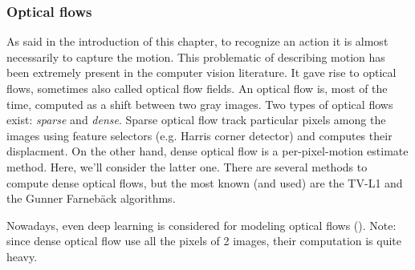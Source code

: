 \documentclass[12pt, a4paper]{report}
\begin{document}
				\subsubsection{Optical flows}
					As said in the introduction of this chapter, to recognize an action it is almost necessarily to capture the motion.
					This problematic of describing motion has been extremely present in the computer vision literature.
					It gave rise to optical flows, sometimes also called optical flow fields.
					An optical flow is, most of the time, computed as a shift between two gray images.
					Two types of optical flows exist: {\itshape sparse} and {\itshape dense}.
					Sparse optical flow track particular pixels among the images using feature selectors (e.g. Harris corner detector) and computes their displacment.
					On the other hand, dense optical flow is a per-pixel-motion estimate method.
					Here, we'll consider the latter one.
					There are several methods to compute dense optical flows, but the most known (and used) are the TV-L1 \cite{sanchez} and the Gunner Farnebäck \cite{farneback} algorithms.\par
					Nowadays, even deep learning is considered for modeling optical flows (\cite{hur}).
					Note: since dense optical flow use all the pixels of 2 images, their computation is quite heavy.
\end{document}
